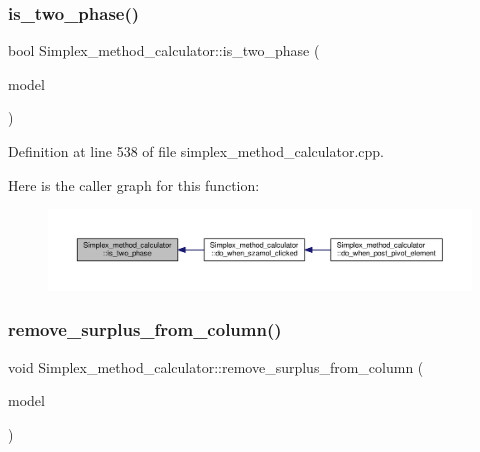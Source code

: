 \subsubsection{\texorpdfstring{is\+\_\+two\+\_\+phase()}{is\_two\_phase()}}
{\footnotesize\ttfamily bool Simplex\+\_\+method\+\_\+calculator\+::is\+\_\+two\+\_\+phase (\begin{DoxyParamCaption}\item[{Q\+Standard\+Item\+Model $\ast$}]{model }\end{DoxyParamCaption})\hspace{0.3cm}{\ttfamily [private]}}



Definition at line 538 of file simplex\+\_\+method\+\_\+calculator.\+cpp.

Here is the caller graph for this function\+:\nopagebreak
\begin{figure}[H]
\begin{center}
\leavevmode
\includegraphics[width=350pt]{classSimplex__method__calculator_ada7c9fda10b113b93cc80d77c57727da_icgraph}
\end{center}
\end{figure}
\mbox{\label{classSimplex__method__calculator_ab5bb8261a97db63956fad14a0c1f0f05}} 
\subsubsection{\texorpdfstring{remove\+\_\+surplus\+\_\+from\+\_\+column()}{remove\_surplus\_from\_column()}}
{\footnotesize\ttfamily void Simplex\+\_\+method\+\_\+calculator\+::remove\+\_\+surplus\+\_\+from\+\_\+column (\begin{DoxyParamCaption}\item[{Q\+Standard\+Item\+Model $\ast$}]{model }\end{DoxyParamCaption})\hspace{0.3cm}{\ttfamily [private]}}



